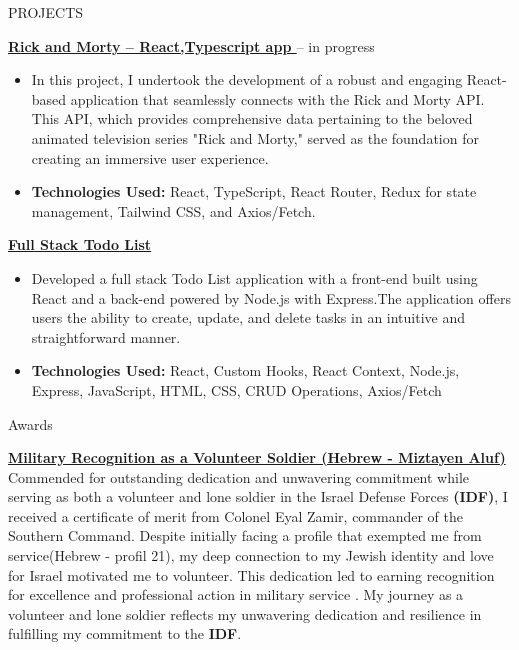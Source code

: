 \documentclass{resume}
\begin{document}
 \begin{rSection}{PROJECTS}

  \textbf{\href{https://github.com/Asnvir/React-TS-RickMorty}{Rick and Morty – React,Typescript app }}– in progress

  \begin{itemize}
   \item In this project, I undertook the development of a robust and engaging React-based application that seamlessly connects with the Rick and Morty API. This API, which provides comprehensive data pertaining to the beloved animated television series "Rick and Morty," served as the foundation for creating an immersive user experience.
   \item \textbf{Technologies Used:} React, TypeScript, React Router, Redux for state management, Tailwind CSS, and Axios/Fetch.

  \end{itemize}

  \vspace{0.25em} %

  \textbf{{\href{https://github.com/Asnvir/todo-react-app}{Full Stack Todo List }}}

  \begin{itemize}
   \item Developed a full stack Todo List application with a front-end built using React and a back-end powered by Node.js with Express.The application offers users the ability to create, update, and delete tasks in an intuitive and straightforward manner.
   \item \textbf{Technologies Used:} React, Custom Hooks, React Context, Node.js, Express, JavaScript, HTML, CSS, CRUD Operations, Axios/Fetch
  \end{itemize}


 \end{rSection}

 \begin{rSection}{Awards}
  \vspace{-1.25em}
  \item \textbf{\href{https://drive.google.com/file/d/1QWiVud-gSK4n_YLskh-mxVn0zGRxDvHW/view?usp=sharing}{Military Recognition as a Volunteer Soldier (Hebrew - Miztayen Aluf)}}
  \\Commended for outstanding dedication and unwavering commitment while serving as
  both a volunteer and lone soldier in the Israel Defense Forces \textbf{(IDF)}, I received a
  certificate of merit from Colonel Eyal Zamir, commander of the Southern Command.
  Despite initially facing a profile that exempted me from service(Hebrew - profil 21), my deep
  connection to my Jewish identity and love for Israel motivated me to volunteer. This
  dedication led to earning recognition for excellence and professional action in military
  service . My journey as a volunteer and lone soldier reflects my unwavering dedication
  and resilience in fulfilling my commitment to the \textbf{IDF}.
 \end{rSection}
\end{document}

